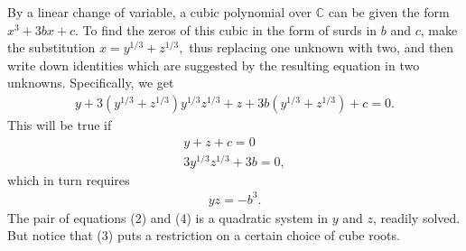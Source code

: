 \documentclass[12pt]{article}
\newcommand{\<}{\langle}
\renewcommand{\>}{\rangle}
\begin{document}
By a linear change of variable, a cubic polynomial over ${\mathbb C}$ can
be given the form $x^3+3bx+c$. To find the zeros of this cubic in the
form of surds in $b$ and $c$, make the substitution $x=y^{1/3}+z^{1/3},$ thus replacing one unknown with two, and then write down identities which are suggested by the resulting equation in two unknowns. Specifically, we get
\begin{align}
y+3(y^{1/3}+z^{1/3})y^{1/3}z^{1/3}+z+3b(y^{1/3}+z^{1/3})+c=0.
\end{align}
This will be true if
\begin{align}
y+z+c=0 \\
3y^{1/3}z^{1/3}+3b=0,
\end{align}
which in turn requires
\begin{align}
yz=-b^3.
\end{align}
The pair of equations (2) and (4) is a quadratic system in $y$ and $z$,
readily solved. But notice that (3) puts a restriction on a certain
choice of cube roots.
\end{document}
